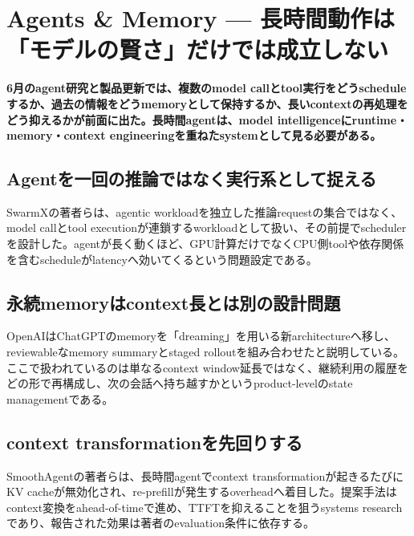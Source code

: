 \section{Agents \& Memory — 長時間動作は「モデルの賢さ」だけでは成立しない}
\label{pkg:agents-memory-june}
\noindent\textbf{6月のagent研究と製品更新では、複数のmodel callとtool実行をどうscheduleするか、過去の情報をどうmemoryとして保持するか、長いcontextの再処理をどう抑えるかが前面に出た。長時間agentは、model intelligenceにruntime・memory・context engineeringを重ねたsystemとして見る必要がある。}\autocite{src-80f8b4d899ff,src-c3ab33c62226,src-e8d9fd84bddc}

\subsection{Agentを一回の推論ではなく実行系として捉える}

SwarmXの著者らは、agentic workloadを独立した推論requestの集合ではなく、model callとtool executionが連鎖するworkloadとして扱い、その前提でschedulerを設計した。agentが長く動くほど、GPU計算だけでなくCPU側toolや依存関係を含むscheduleがlatencyへ効いてくるという問題設定である。\autocite{src-e8d9fd84bddc}


\subsection{永続memoryはcontext長とは別の設計問題}

OpenAIはChatGPTのmemoryを「dreaming」を用いる新architectureへ移し、reviewableなmemory summaryとstaged rolloutを組み合わせたと説明している。ここで扱われているのは単なるcontext window延長ではなく、継続利用の履歴をどの形で再構成し、次の会話へ持ち越すかというproduct-levelのstate managementである。\autocite{src-c3ab33c62226}


\subsection{context transformationを先回りする}

SmoothAgentの著者らは、長時間agentでcontext transformationが起きるたびにKV cacheが無効化され、re-prefillが発生するoverheadへ着目した。提案手法はcontext変換をahead-of-timeで進め、TTFTを抑えることを狙うsystems researchであり、報告された効果は著者のevaluation条件に依存する。\autocite{src-80f8b4d899ff}


